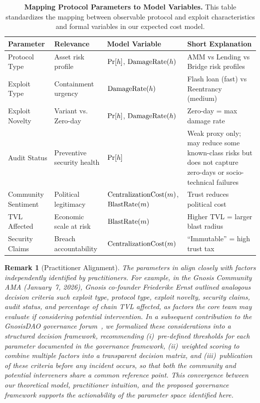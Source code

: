 \documentclass[12pt]{article}
\newif\ifconcise
\newtheorem{remark}{Remark}
\begin{document}
\begin{table}[h]
\centering
\caption{\textbf{Mapping Protocol Parameters to Model Variables.} This table standardizes the mapping between observable protocol and exploit characteristics and formal variables in our expected cost model.}
\label{tab:risk_factors}
\small
\begin{tabularx}{\linewidth}{@{}>{\raggedright\arraybackslash}p{2.3cm}>{\raggedright\arraybackslash}p{2.8cm}>{\raggedright\arraybackslash}p{3.8cm}X@{}}
\toprule
\textbf{Parameter} & \textbf{Relevance} & \textbf{Model Variable} & \textbf{Short Explanation} \\
\midrule
Protocol Type & Asset risk profile & $\Pr[h]$, $\mathrm{DamageRate}(h)$ & AMM vs Lending vs Bridge risk profiles \\
Exploit Type & Containment urgency & $\mathrm{DamageRate}(h)$ & Flash loan (fast) vs Reentrancy (medium) \\
Exploit Novelty & Variant vs. Zero-day & $\Pr[h]$, $\mathrm{DamageRate}(h)$ & Zero-day = max damage rate \\
Audit Status & Preventive security health & $\Pr[h]$ & Weak proxy only; may reduce some known-class risks but does not capture zero-days or socio-technical failures \\
Community Sentiment & Political legitimacy & $\mathrm{CentralizationCost}(m)$, $\mathrm{BlastRate}(m)$ & Trust reduces political cost \\
TVL Affected & Economic scale at risk & $\mathrm{BlastRate}(m)$ & Higher TVL = larger blast radius \\
Security Claims & Breach accountability & $\mathrm{CentralizationCost}(m)$ & ``Immutable'' = high trust tax \\
\bottomrule
\end{tabularx}
\end{table}

\ifconcise\else
\begin{remark}[Practitioner Alignment]
The parameters in  align closely with factors independently identified by practitioners.
%
For example, in the Gnosis Community AMA (January~7, 2026), Gnosis co-founder Friederike Ernst outlined analogous decision criteria such exploit type, protocol type, exploit novelty, security claims, audit status, and percentage of chain TVL affected, as factors the core team may evaluate if considering potential intervention.
In a subsequent contribution to the GnosisDAO governance forum~\cite{GnosisForumFramework2026}, we formalized these considerations into a structured decision framework, recommending (i)~pre-defined thresholds for each parameter documented in the governance framework, (ii)~weighted scoring to combine multiple factors into a transparent decision matrix, and (iii)~publication of these criteria before any incident occurs, so that both the community and potential interveners share a common reference point.
This convergence between our theoretical model, practitioner intuition, and the proposed governance framework supports the actionability of the parameter space identified here.
\end{remark}
\fi
\end{document}
